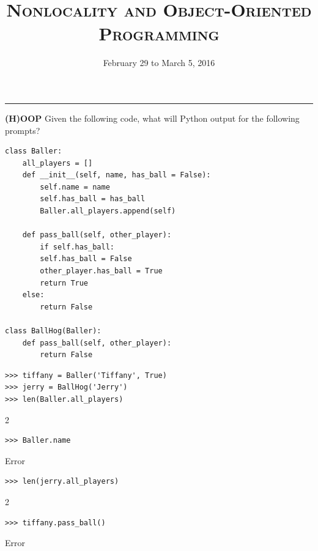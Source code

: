 \documentclass{exam}
\title{\textsc{Nonlocality and Object-Oriented Programming}}
\date{February 29 to March 5, 2016}
\begin{document}
\maketitle
\rule{\textwidth}{0.15em}
\fontsize{12}{15}\selectfont




\begin{questions}
\begin{blocksection}
\question \textbf{(H)OOP} \newline
Given the following code, what will Python output for the following prompts? 

\begin{lstlisting}
class Baller:
    all_players = []
    def __init__(self, name, has_ball = False):
        self.name = name
        self.has_ball = has_ball
        Baller.all_players.append(self)
    
    def pass_ball(self, other_player):
        if self.has_ball:
        self.has_ball = False
        other_player.has_ball = True
        return True
    else:
        return False

class BallHog(Baller):
    def pass_ball(self, other_player):  
        return False    
\end{lstlisting}

\begin{lstlisting}
>>> tiffany = Baller('Tiffany', True)
>>> jerry = BallHog('Jerry')
>>> len(Baller.all_players)
\end{lstlisting}
\begin{solution}[.2in]
2
\end{solution}
\end{blocksection}

\begin{blocksection}
\begin{lstlisting}
>>> Baller.name
\end{lstlisting}
\begin{solution}[.2in]
Error
\end{solution}

\begin{lstlisting}
>>> len(jerry.all_players)
\end{lstlisting}
\begin{solution}[.2in]
2
\end{solution}

\begin{lstlisting}
>>> tiffany.pass_ball()
\end{lstlisting}
\begin{solution}[.2in]
Error
\end{solution}


\end{blocksection}
\end{questions}
\end{document}
